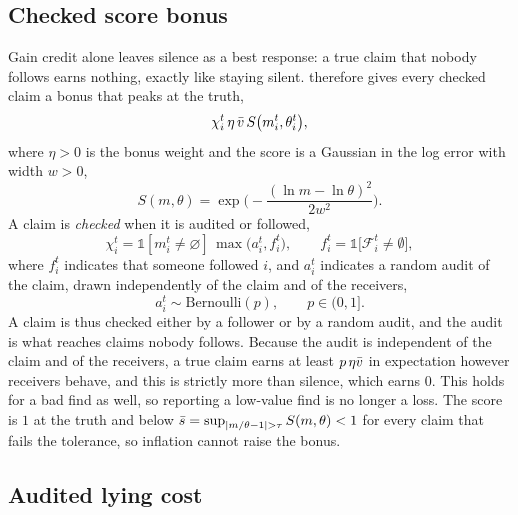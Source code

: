 \subsection{Checked score bonus}
\label{sec:bonus}

Gain credit alone leaves silence as a best response: a true claim that nobody follows earns nothing, exactly like staying silent. \tvc{} therefore gives every checked claim a bonus that peaks at the truth,
\begin{equation}
  \chi_i^t\,\eta\,\bar v\,S\big(m_i^t,\theta_i^t\big),
  \label{eq:bonus}
\end{equation}
where $\eta>0$ is the bonus weight and the score is a Gaussian in the log error with width $w>0$,
\begin{equation}
  S(m,\theta)=\exp\!\Big(-\frac{(\ln m-\ln\theta)^2}{2w^2}\Big).
  \label{eq:score}
\end{equation}
A claim is \emph{checked} when it is audited or followed,
\begin{equation}
  \chi_i^t=\mathbb 1[m_i^t\neq\varnothing]\,\max\big(a_i^t,f_i^t\big),
  \qquad
  f_i^t=\mathbb 1\big[\mathcal F_i^t\neq\emptyset\big],
  \label{eq:checked}
\end{equation}
where $f_i^t$ indicates that someone followed $i$, and $a_i^t$ indicates a random audit of the claim, drawn independently of the claim and of the receivers,
\begin{equation}
  a_i^t\sim\mathrm{Bernoulli}(p),\qquad p\in(0,1].
  \label{eq:audit}
\end{equation}
A claim is thus checked either by a follower or by a random audit, and the audit is what reaches claims nobody follows. Because the audit is independent of the claim and of the receivers, a true claim earns at least $p\,\eta\bar v$ in expectation however receivers behave, and this is strictly more than silence, which earns $0$. This holds for a bad find as well, so reporting a low-value find is no longer a loss. The score is $1$ at the truth and below $\sbar=\sup_{|m/\theta-1|>\tau}S(m,\theta)<1$ for every claim that fails the tolerance, so inflation cannot raise the bonus.

\subsection{Audited lying cost}
\label{sec:cost}

